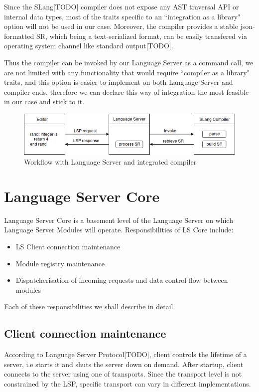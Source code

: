 Since the SLang[TODO] compiler does not expose any AST traversal API or internal data types, most of 
the traits specific to an ``integration as a library" option will not be used in our case.
Moreover, the compiler provides a stable json-formatted SR, which being a text-serialized format, 
can be easily transfered via operating system channel like standard output[TODO].

Thus the compiler can be invoked by our Language Server as a command call, we are not limited 
with any functionality that would require ``compiler as a library" traits, and this option
is easier to implement on both Language Server and compiler ends,
therefore we can declare this way of integration the most feasible in our case and stick to it.

\begin{figure}[H]
    \centering
    \includegraphics[width=1.0\textwidth]{figs/compiler_integration.png}
    \caption{Workflow with Language Server and integrated compiler}
\end{figure}

\section{Language Server Core}
\label{sec:met:ls_design}
Language Server Core is a basement level of the Language Server on which Language Server Modules will operate.
Responsibilities of LS Core include:
\begin{itemize}
    \item LS Client connection maintenance
    \item Module registry maintenance
    \item Dispatcherisation of incoming requests and data control flow between modules
\end{itemize}

Each of these responsibilities we shall describe in detail.

\subsection{Client connection maintenance}
\label{sec:met:ls_design:MaintainConnection}
According to Language Server Protocol[TODO], client controls the lifetime of a server, 
i.e starts it and shuts the server down on demand. After startup, client connects to the server
using one of transports. Since the transport level is not constrained by the LSP, specific transport 
can vary in different implementations.


